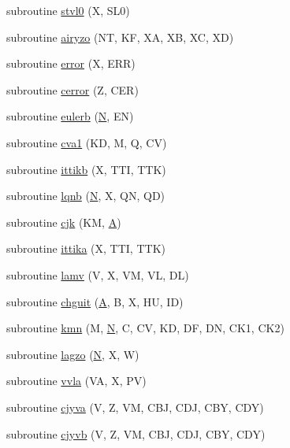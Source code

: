\begin{DoxyCompactItemize}
subroutine \hyperlink{specfun_8f_a9727c5316965b91377811aba530d8b27}{stvl0} (X, S\+L0)
\item 
subroutine \hyperlink{specfun_8f_a530a95d61655179cba0fec2169d9afb8}{airyzo} (N\+T, K\+F, X\+A, X\+B, X\+C, X\+D)
\item 
subroutine \hyperlink{specfun_8f_a1606d291e8b683668654c8d4219efa20}{error} (X, E\+R\+R)
\item 
subroutine \hyperlink{specfun_8f_a10096e1b3d4162ddf03a892ba701fabc}{cerror} (Z, C\+E\+R)
\item 
subroutine \hyperlink{specfun_8f_a13a8ff56c664d92c536cc28398f44f0b}{eulerb} (\hyperlink{polmisc_8c_a0240ac851181b84ac374872dc5434ee4}{N}, E\+N)
\item 
subroutine \hyperlink{specfun_8f_a535ccf0d76b87ffcaf4acd4f414249d3}{cva1} (K\+D, M, Q, C\+V)
\item 
subroutine \hyperlink{specfun_8f_a15184d429aa7eac0283bb1c0cdedbd42}{ittikb} (X, T\+T\+I, T\+T\+K)
\item 
subroutine \hyperlink{specfun_8f_a47bb61cc9ff456113bfe91d7bd0d3fdc}{lqnb} (\hyperlink{polmisc_8c_a0240ac851181b84ac374872dc5434ee4}{N}, X, Q\+N, Q\+D)
\item 
subroutine \hyperlink{specfun_8f_aec86594eea52e1ad9fdc9988b0d230e1}{cjk} (K\+M, \hyperlink{classA}{A})
\item 
subroutine \hyperlink{specfun_8f_a5236a4c0095980125e6bc4d62b96a8f4}{ittika} (X, T\+T\+I, T\+T\+K)
\item 
subroutine \hyperlink{specfun_8f_a169fc98f09cf44c6ed4d61d8cb466e0c}{lamv} (V, X, V\+M, V\+L, D\+L)
\item 
subroutine \hyperlink{specfun_8f_af75ccaa543a6ffba9aba7233b28e367c}{chguit} (\hyperlink{classA}{A}, B, X, H\+U, I\+D)
\item 
subroutine \hyperlink{specfun_8f_a6c9a910f0a6d3101b0bc6531410b9971}{kmn} (M, \hyperlink{polmisc_8c_a0240ac851181b84ac374872dc5434ee4}{N}, C, C\+V, K\+D, D\+F, D\+N, C\+K1, C\+K2)
\item 
subroutine \hyperlink{specfun_8f_abea0c5bd6539995ab08db20d0c1e6345}{lagzo} (\hyperlink{polmisc_8c_a0240ac851181b84ac374872dc5434ee4}{N}, X, W)
\item 
subroutine \hyperlink{specfun_8f_aec82113ddcd665428c281d3a7e042099}{vvla} (V\+A, X, P\+V)
\item 
subroutine \hyperlink{specfun_8f_ab7cde053fb1abd91c668379f8751bcd5}{cjyva} (V, Z, V\+M, C\+B\+J, C\+D\+J, C\+B\+Y, C\+D\+Y)
\item 
subroutine \hyperlink{specfun_8f_afce3be04fa3e45c91dfa5ecaf1c57b0a}{cjyvb} (V, Z, V\+M, C\+B\+J, C\+D\+J, C\+B\+Y, C\+D\+Y)

\end{DoxyCompactItemize}
